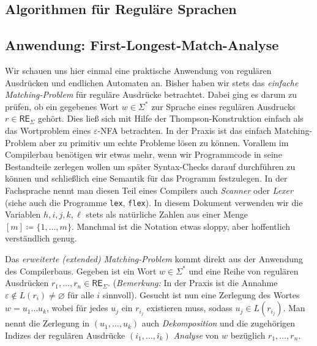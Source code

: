 \documentclass[11pt, a4paper]{article}
\theoremstyle{definition}
\theoremstyle{plain}
\numberwithin{equation}{section}
\let\emptyset\varnothing
\begin{document}
\subsection{Algorithmen für Reguläre Sprachen}\label{sec:regular_algorithms}


\subsection{Anwendung: First-Longest-Match-Analyse}\label{sec:regular_first-longest-match}
Wir schauen uns hier einmal eine praktische Anwendung von regulären Ausdrücken und endlichen Automaten an. Bisher haben wir stets das \textit{einfache Matching-Problem} für reguläre Ausdrücke betrachtet. Dabei ging es darum zu prüfen, ob ein gegebenes Wort $w \in \Sigma^\ast$ zur Sprache eines regulären Ausdrucks $r \in \mathsf{RE}_\Sigma$ gehört. Dies ließ sich mit Hilfe der Thompson-Konstruktion einfach als das Wortproblem eines $\varepsilon$-NFA betrachten. In der Praxis ist das einfach Matching-Problem aber zu primitiv um echte Probleme lösen zu können. Vorallem im Compilerbau benötigen wir etwas mehr, wenn wir Programmcode in seine Bestandteile zerlegen wollen um später Syntax-Checks darauf durchführen zu können und schließlich eine Semantik für das Programm festzulegen. In der Fachsprache nennt man diesen Teil eines Compilers auch \textit{Scanner} oder \textit{Lexer} (siehe auch die Programme \texttt{lex}, \texttt{flex}).
In diesem Dokument verwenden wir die Variablen $h, i, j, k, \ell$ stets als natürliche Zahlen aus einer Menge $[m] \coloneqq \{ 1, \ldots, m \}$. Manchmal ist die Notation etwas sloppy, aber hoffentlich verständlich genug.


Das \textit{erweiterte (extended) Matching-Problem} kommt direkt aus der Anwendung des Compilerbaus. Gegeben ist ein Wort $w \in \Sigma^\ast$ und eine Reihe von regulären Ausdrücken $r_1, \ldots, r_n \in \mathsf{RE}_\Sigma$. (\textit{Bemerkung:} In der Praxis ist die Annahme $\varepsilon \notin L(r_i) \neq \emptyset$ für alle $i$ sinnvoll). Gesucht ist nun eine Zerlegung des Wortes $w = u_1 \ldots u_k$, wobei für jedes $u_j$ ein $r_{i_j}$ existieren muss, sodass $u_j \in L(r_{i_j})$. Man nennt die Zerlegung in $(u_1, \ldots, u_k)$ auch \textit{Dekomposition} und die zugehörigen Indizes der regulären Ausdrücke $(i_1, \ldots, i_k)$ \textit{Analyse} von $w$ bezüglich $r_1, \ldots, r_n$.
\end{document}
